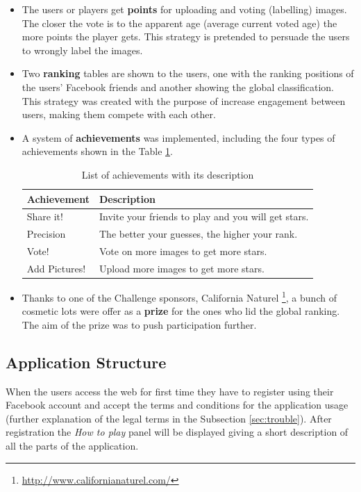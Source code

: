 \begin{itemize}
	\item The users or players get \textbf{points} for uploading and voting (labelling) images. The closer the vote is to the apparent age (average current voted age) the more points the player gets. This strategy is pretended to persuade the users to wrongly label the images.
	\item Two \textbf{ranking} tables are shown to the users, one with the ranking positions of the users' Facebook friends and another showing the global classification. This strategy was created with the purpose of increase engagement between users, making them compete with each other. 
	\item A system of \textbf{achievements} was implemented, including the four types of achievements shown in the Table \ref{tab:achiev}.
	\begin{table}[!h]
		\centering
		\begin{tabular}{l|l}
			\textbf{Achievement} & \textbf{Description} \\ \hline
			Share it! &	Invite your friends to play and you will get stars.	\\
			Precision &	The better your guesses, the higher your rank. \\
			Vote! &	Vote on more images to get more stars.\\	
			Add Pictures! &	Upload more images to get more stars. \\
		\end{tabular}
		\caption{List of achievements with its description}
		\label{tab:achiev}
	\end{table}
	\item Thanks to one of the Challenge sponsors, California Naturel \footnote{\url{http://www.californianaturel.com/}}, a bunch of cosmetic lots were offer as a \textbf{prize} for the ones who lid the global ranking. The aim of the prize was to push participation further.
\end{itemize}


\subsection{Application Structure}
When the users access the web for first time they have to register using their Facebook account and accept the terms and conditions for the application usage (further explanation of the legal terms in the Subsection \ref{sec:trouble}). After registration the \textit{How to play} panel will be displayed giving a short description of all the parts of the application.

